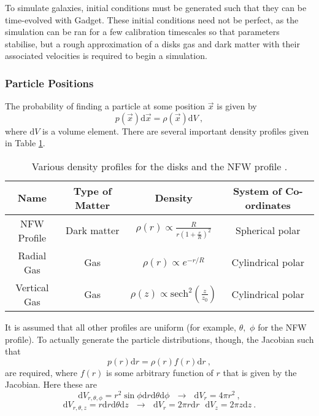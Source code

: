 To simulate galaxies, initial conditions must be generated such that they
can be time-evolved with Gadget. These initial conditions need not be
perfect, as the simulation can be ran for a few calibration timescales
so that parameters stabilise, but a rough approximation
of a disks gas and dark matter with their associated velocities is required to
begin a simulation.

\subsubsection{Particle Positions}

The probability of finding a particle at some position \(\vec{x}\) is
given by
\[
    p(\vec{x})\mathrm{d}\vec{x} = \rho(\vec{x})\mathrm{d}V~,
\]
where \(\mathrm{d}V\) is a volume element. There are several important
density profiles given in Table \ref{tab:profiles}.

\begin{table}
\centering
\begin{tabular}{c|c|c|c}
Name   &  Type of Matter  &    Density               & System of Co-ordinates \\ \hline
NFW Profile & Dark matter & $\rho(r) \propto \frac{R}{r\left(1 + \frac{r}{R}\right)^2}$ & Spherical polar \\
Radial Gas  & Gas & $\rho(r) \propto e^{-r/R}$ & Cylindrical polar \\
Vertical Gas & Gas & $\rho(z) \propto \mathrm{sech}^2\left(\frac{z}{z_0}\right)$ & Cylindrical polar \\
\end{tabular}
\caption{Various density profiles for the disks and the NFW profile \citep{ferriere_interstellar_2001, coe_dark_2010}.}
\label{tab:profiles}
\end{table}

It is assumed that all other profiles are uniform (for example,
\(\theta,\) \(\phi\) for the NFW profile). To actually generate the
particle distributions, though, the Jacobian such that
\[
    p(r)\mathrm{d}r = \rho(r) f(r) \mathrm{d}r~,
\]
are required, where \(f(r)\) is some arbitrary function of \(r\) that is given by the
Jacobian. Here these are
\[
    \mathrm{d}V_{r, \theta, \phi} = r^2\sin\phi\mathrm{d}r\mathrm{d}\theta\mathrm{d}\phi ~ ~ ~ \rightarrow ~ ~ ~ \mathrm{d}V_{r} = 4\pi r^2~,
\] \[
    \mathrm{d}V_{r, \theta, z} = r\mathrm{d}r\mathrm{d}\theta\mathrm{d}z ~ ~ ~ \rightarrow ~ ~ ~ \mathrm{d}V_{r} = 2\pi r \mathrm{d}r ~ ~ ~ \mathrm{d}V_z = 2\pi z \mathrm{d}z~.
\]

